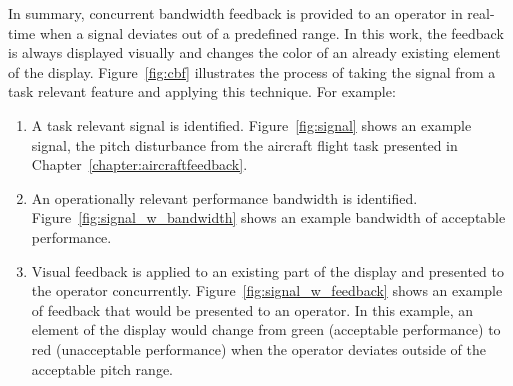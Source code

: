 In summary, concurrent bandwidth feedback is provided to an operator in real-time when a signal deviates out of a predefined range.
In this work, the feedback is always displayed visually and changes the color of an already existing element of the display.
Figure~\ref{fig:cbf} illustrates the process of taking the signal from a task relevant feature and applying this technique.
For example:
\begin{enumerate}
    \item A task relevant signal is identified.
          Figure~\ref{fig:signal} shows an example signal, the pitch disturbance from the aircraft flight task presented in Chapter~\ref{chapter:aircraftfeedback}.
    \item An operationally relevant performance bandwidth is identified.
          Figure~\ref{fig:signal_w_bandwidth} shows an example bandwidth of acceptable performance.
    \item Visual feedback is applied to an existing part of the display and presented to the operator concurrently.
          Figure~\ref{fig:signal_w_feedback} shows an example of feedback that would be presented to an operator.
          In this example, an element of the display would change from green (acceptable performance) to red (unacceptable performance) when the operator deviates outside of the acceptable pitch range.
\end{enumerate}

